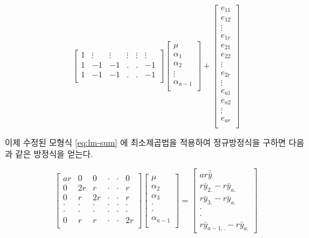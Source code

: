\documentclass[
]{book}
\theoremstyle{definition}
\theoremstyle{definition}
\theoremstyle{definition}
\theoremstyle{definition}
\theoremstyle{remark}
\begin{document}
\begin{equation}
\begin{bmatrix}
1 & \vdots & \vdots & \vdots & \vdots & \vdots \\
1 & -1 & -1 & . & . & -1 \\
1 & -1 & -1 & . & . & -1 \\
\end{bmatrix}
\begin{bmatrix}
\mu \\
\alpha_{1} \\
\alpha_{2} \\
\vdots \\
\alpha_{a-1} \\
\end{bmatrix} +
\begin{bmatrix}
e_{11} \\
e_{12} \\
\vdots \\
e_{1r} \\
e_{21} \\
e_{22} \\
\vdots \\
e_{2r} \\
\vdots \\
e_{a1} \\
e_{a2} \\
\vdots \\
e_{ar} \\
\end{bmatrix}
\label{eq:lm-sum}
\end{equation}

이제 수정된 모형식 \eqref{eq:lm-sum} 에 최소제곱법을 적용하여 정규방정식을 구하면 다음과 같은 방정식을 얻는다.

\begin{equation}
\begin{bmatrix}
ar   & 0 & 0 & \cdot & \cdot & 0 \\
0 & 2r &  r  & \cdot & \cdot & r \\
0 & r   & 2r  & \cdot & \cdot & r \\
\cdot & \cdot   & \cdot  & \cdot & \cdot & \cdot \\
\cdot & \cdot   & \cdot  & \cdot & \cdot & \cdot \\
0 & r   &  r   & \cdot & \cdot & 2r \\
\end{bmatrix}
\begin{bmatrix}
\mu \\
\alpha_{2} \\
\alpha_{3} \\
\cdot \\
\cdot \\
\alpha_{a-1} \\
\end{bmatrix}
=
\begin{bmatrix}
ar \bar {\bar y} \\
r {\bar y}_{2.}-r {\bar y}_{a.} \\
r \bar y_{3.}-r {\bar y}_{a.}\\
\cdot \\
\cdot \\
r \bar y_{a-1,.} -r {\bar y}_{a.}
\end{bmatrix}
\label{eq:normaleq-sum}
\end{equation}
\end{document}
